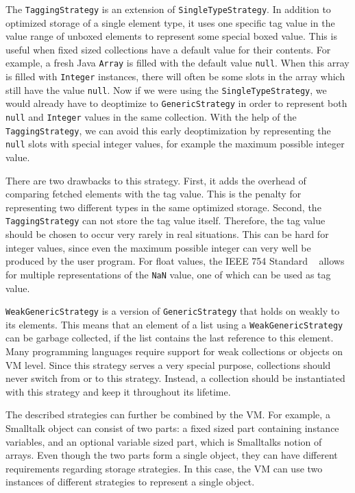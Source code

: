 \documentclass[english,10pt]{sigplanconf}
\begin{document}
The \lstinline{TaggingStrategy} is an extension of
\lstinline{SingleTypeStrategy}.  In addition to optimized storage of a
single element type, it uses one specific tag value in the value range
of unboxed elements to represent some special boxed value.  This is
useful when fixed sized collections have a default value for their
contents.  For example, a fresh Java \lstinline{Array} is filled with
the default value \lstinline{null}.  When this array is filled with
\lstinline{Integer} instances, there will often be some slots in the
array which still have the value \lstinline{null}.  Now if we were
using the \lstinline{SingleTypeStrategy}, we would already have to
deoptimize to \lstinline{GenericStrategy} in order to represent both
\lstinline{null} and \lstinline{Integer} values in the same
collection.  With the help of the \lstinline{TaggingStrategy}, we can
avoid this early deoptimization by representing the \lstinline{null}
slots with special integer values, for example the maximum possible
integer value.

There are two drawbacks to this strategy.  First, it adds the overhead
of comparing fetched elements with the tag value.  This is the penalty
for representing two different types in the same optimized storage.
Second, the \lstinline{TaggingStrategy} can not store the tag value
itself.  Therefore, the tag value should be chosen to occur very
rarely in real situations.  This can be hard for integer values, since
even the maximum possible integer can very well be produced by the
user program.  For float values, the IEEE 754 Standard
~\cite{ieeeFloat} allows for multiple representations of the
\lstinline{NaN} value, one of which can be used as tag value.

\lstinline{WeakGenericStrategy} is a version of
\lstinline{GenericStrategy} that holds on weakly to its elements.
This means that an element of a list using a
\lstinline{WeakGenericStrategy} can be garbage collected, if the list
contains the last reference to this element.  Many programming
languages require support for weak collections or objects on VM level.
Since this strategy serves a very special purpose, collections should
never switch from or to this strategy.  Instead, a collection should
be instantiated with this strategy and keep it throughout its
lifetime.

The described strategies can further be combined by the VM.  For
example, a Smalltalk object can consist of two parts: a fixed sized
part containing instance variables, and an optional variable sized
part, which is Smalltalks notion of arrays.  Even though the two parts
form a single object, they can have different requirements regarding
storage strategies.  In this case, the VM can use two instances of
different strategies to represent a single object.
\end{document}
